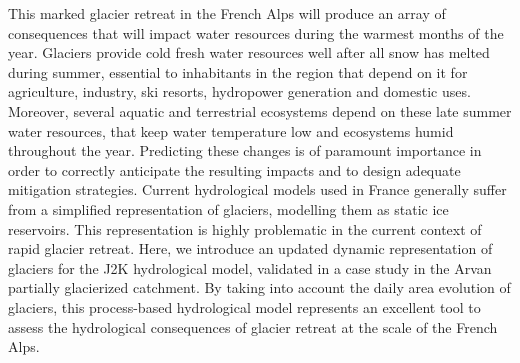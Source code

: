 This marked glacier retreat in the French Alps will produce an array of consequences that will impact water resources during the warmest months of the year. Glaciers provide cold fresh water resources well after all snow has melted during summer, essential to inhabitants in the region that depend on it for agriculture, industry, ski resorts, hydropower generation and domestic uses. Moreover, several aquatic and terrestrial ecosystems depend on these late summer water resources, that keep water temperature low and ecosystems humid throughout the year. Predicting these changes is of paramount importance in order to correctly anticipate the resulting impacts and to design adequate mitigation strategies. Current hydrological models used in France generally suffer from a simplified representation of glaciers, modelling them as static ice reservoirs. This representation is highly problematic in the current context of rapid glacier retreat. Here, we introduce an updated dynamic representation of glaciers for the J2K hydrological model, validated in a case study in the Arvan partially glacierized catchment. By taking into account the daily area evolution of glaciers, this process-based hydrological model represents an excellent tool to assess the hydrological consequences of glacier retreat at the scale of the French Alps. 